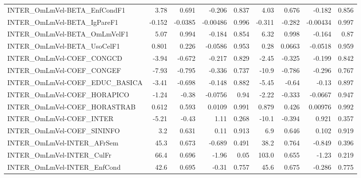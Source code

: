 \begin{tabular}{lrrrrrrrr}
INTER\_OmLmVel-BETA\_EnfCondF1          &        3.78 &        0.691 &   -0.206 &    0.837 &       4.03 &       0.676 &       -0.182 &         0.856 \\
INTER\_OmLmVel-BETA\_IgPareF1           &      -0.152 &      -0.0385 & -0.00486 &    0.996 &     -0.311 &      -0.282 &     -0.00434 &         0.997 \\
INTER\_OmLmVel-BETA\_OmLmVelF1          &        5.07 &        0.994 &   -0.184 &    0.854 &       6.32 &       0.998 &       -0.164 &          0.87 \\
INTER\_OmLmVel-BETA\_UsoCelF1           &       0.801 &        0.226 &  -0.0586 &    0.953 &       0.28 &      0.0663 &      -0.0518 &         0.959 \\
INTER\_OmLmVel-COEF\_CONGCD             &       -3.94 &       -0.672 &   -0.217 &    0.829 &      -2.45 &      -0.325 &       -0.199 &         0.842 \\
INTER\_OmLmVel-COEF\_CONGEF             &       -7.93 &       -0.795 &   -0.336 &    0.737 &      -10.9 &      -0.786 &       -0.296 &         0.767 \\
INTER\_OmLmVel-COEF\_EDUC\_BASICA        &       -3.41 &       -0.698 &   -0.148 &    0.882 &      -5.45 &       -0.64 &        -0.13 &         0.897 \\
INTER\_OmLmVel-COEF\_HORAPICO           &       -1.24 &        -0.38 &  -0.0756 &     0.94 &      -2.22 &      -0.333 &      -0.0667 &         0.947 \\
INTER\_OmLmVel-COEF\_HORASTRAB          &       0.612 &        0.593 &   0.0109 &    0.991 &      0.879 &       0.426 &      0.00976 &         0.992 \\
INTER\_OmLmVel-COEF\_INTER              &       -5.21 &        -0.43 &     1.11 &    0.268 &      -10.1 &      -0.394 &        0.921 &         0.357 \\
INTER\_OmLmVel-COEF\_SININFO            &         3.2 &        0.631 &     0.11 &    0.913 &        6.9 &       0.646 &        0.102 &         0.919 \\
INTER\_OmLmVel-INTER\_AFrSem            &        45.3 &        0.673 &   -0.689 &    0.491 &       38.2 &       0.764 &       -0.849 &         0.396 \\
INTER\_OmLmVel-INTER\_CulFr             &        66.4 &        0.696 &    -1.96 &     0.05 &      103.0 &       0.655 &        -1.23 &         0.219 \\
INTER\_OmLmVel-INTER\_EnfCond           &        42.6 &        0.695 &    -0.31 &    0.757 &       45.6 &       0.675 &       -0.286 &         0.775 \\

\end{tabular}
